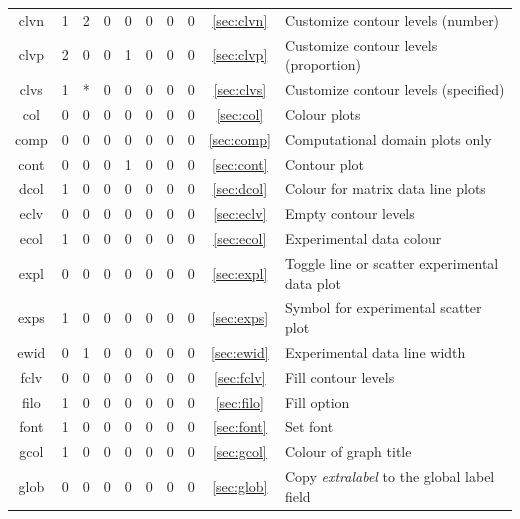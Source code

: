 \documentclass[a4paper,10pt]{report}
\begin{document}
\begin{center}
\begin{longtable}{|c|c|c|c|c|c|c|c|c|l|}
    clvn \index{b2plot, clvn}      & 1 & 2 & 0 & 0 & 0 & 0 & 0 & \ref{sec:clvn}   & Customize contour levels (number) \\
    clvp \index{b2plot, clvp}      & 2 & 0 & 0 & 1 & 0 & 0 & 0 & \ref{sec:clvp}   & Customize contour levels (proportion) \\
    clvs \index{b2plot, clvs}      & 1 & * & 0 & 0 & 0 & 0 & 0 & \ref{sec:clvs}   & Customize contour levels (specified) \\
    col \index{b2plot, col}        & 0 & 0 & 0 & 0 & 0 & 0 & 0 & \ref{sec:col}    & Colour plots \\
    comp \index{b2plot, comp}      & 0 & 0 & 0 & 0 & 0 & 0 & 0 & \ref{sec:comp}   & Computational domain plots only \\
    cont \index{b2plot, cont}      & 0 & 0 & 0 & 1 & 0 & 0 & 0 & \ref{sec:cont}   & Contour plot \\
    dcol \index{b2plot, dcol}      & 1 & 0 & 0 & 0 & 0 & 0 & 0 & \ref{sec:dcol}   & Colour for matrix data line plots \\
    eclv \index{b2plot, eclv}      & 0 & 0 & 0 & 0 & 0 & 0 & 0 & \ref{sec:eclv}   & Empty contour levels \\
    ecol \index{b2plot, ecol}      & 1 & 0 & 0 & 0 & 0 & 0 & 0 & \ref{sec:ecol}   & Experimental data colour \\
    expl \index{b2plot, expl}      & 0 & 0 & 0 & 0 & 0 & 0 & 0 & \ref{sec:expl}   & Toggle line or scatter experimental data plot \\
    exps \index{b2plot, exps}      & 1 & 0 & 0 & 0 & 0 & 0 & 0 & \ref{sec:exps}   & Symbol for experimental scatter plot \\
    ewid \index{b2plot, ewid}      & 0 & 1 & 0 & 0 & 0 & 0 & 0 & \ref{sec:ewid}   & Experimental data line width \\
    fclv \index{b2plot, fclv}      & 0 & 0 & 0 & 0 & 0 & 0 & 0 & \ref{sec:fclv}   & Fill contour levels \\
    filo \index{b2plot, filo}      & 1 & 0 & 0 & 0 & 0 & 0 & 0 & \ref{sec:filo}   & Fill option \\
    font \index{b2plot, font}      & 1 & 0 & 0 & 0 & 0 & 0 & 0 & \ref{sec:font}   & Set font \\
    gcol \index{b2plot, gcol}      & 1 & 0 & 0 & 0 & 0 & 0 & 0 & \ref{sec:gcol}   & Colour of graph title \\
    glob \index{b2plot, glob}      & 0 & 0 & 0 & 0 & 0 & 0 & 0 & \ref{sec:glob}   & Copy {\em extralabel} to the global label field \\

\end{longtable}
\end{center}
\end{document}

